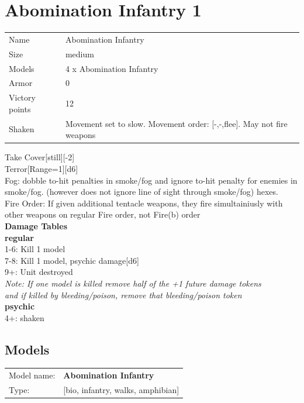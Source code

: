 \clearpage

\section{ Abomination Infantry 1 }

\begin{tabular}{ll}
  Name & Abomination Infantry \\
  Size & medium\\
  Models & 4 x Abomination Infantry\\
  Armor & 0\\
  Victory points & 12\\
  Shaken & Movement set to slow. Movement order: [-,-,flee]. May not fire weapons\\
\end{tabular}

Take Cover[still][-2]\\ 
Terror[Range=1][d6]\\ 
Fog: dobble to-hit penalties in smoke/fog and ignore to-hit penalty for enemies in smoke/fog. (however does not ignore line of sight through smoke/fog) hexes.\\
Fire Order: If given additional tentacle weapons, they fire simultainiusly with other weapons on regular Fire order, not Fire(b) order\\ 



{\bf Damage Tables} \\
 {\bf regular } \\
1-6: Kill 1 model \\
7-8: Kill 1 model, psychic damage[d6] \\
9+: Unit destroyed \\
{{\it Note: If one model is killed remove half of the +1 future damage tokens \\ and if killed by bleeding/poison, remove that bleeding/poison token}} \\
 {\bf psychic } \\
4+: shaken \\


\clearpage

\subsection{ Models }

\begin{tabular}{ll}
Model name: & {\bf Abomination Infantry } \\
Type: & [bio, infantry, walks, amphibian] \\
\end{tabular}


